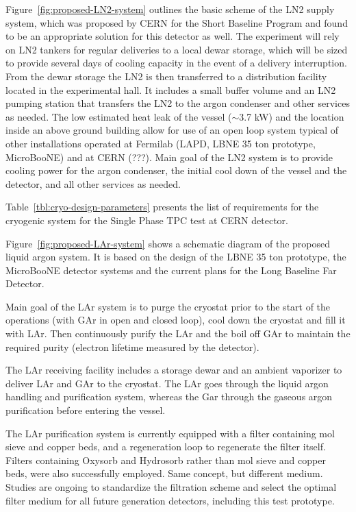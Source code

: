 Figure~\ref{fig:proposed-LN2-system} outlines the basic scheme of the LN2 supply system, which was 
proposed by CERN for the Short Baseline Program and found to be an appropriate solution for this 
detector as well. The experiment will rely on LN2 tankers for regular deliveries to a local dewar storage, 
which will be sized to provide several days of cooling capacity in the event of a delivery interruption. 
From the dewar storage the LN2 is then transferred to a distribution facility located in the experimental 
hall. It includes a small buffer volume and an LN2 pumping station that transfers the LN2 to the argon 
condenser and other services as needed. The low estimated heat leak of the vessel ($\sim$3.7 kW) and the 
location inside an above ground building allow for use of an open loop system typical of other 
installations operated at Fermilab (LAPD, LBNE 35 ton prototype, MicroBooNE) and at CERN (???). 
Main goal of the LN2 system is to provide cooling power for the argon condenser, the initial cool down of 
the vessel and the detector, and all other services as needed.

 Table~\ref{tbl:cryo-design-parameters} presents the list of 
requirements for the cryogenic system for the Single Phase TPC test at CERN detector.

Figure~\ref{fig:proposed-LAr-system} shows a schematic diagram of the proposed liquid argon system. It is based on the design of the 
LBNE 35 ton prototype, the MicroBooNE detector systems and the current plans for the Long Baseline Far 
Detector.

Main goal of the LAr system is to purge the cryostat prior to the start of the operations (with GAr in open 
and closed loop), cool down the cryostat and fill it with LAr. Then continuously purify the LAr and the boil 
off GAr to maintain the required purity (electron lifetime measured by the detector).

The LAr receiving facility includes a storage dewar and an ambient vaporizer to deliver LAr and GAr to the 
cryostat. The LAr goes through the liquid argon handling and purification system, whereas the Gar 
through the gaseous argon purification before entering the vessel.

The LAr purification system is currently equipped with a filter containing mol sieve and copper beds, and 
a regeneration loop to regenerate the filter itself. Filters containing Oxysorb and Hydrosorb rather than 
mol sieve and copper beds, were also successfully employed. Same concept, but different medium. 
Studies are ongoing to standardize the filtration scheme and select the optimal filter medium for all 
future generation detectors, including this test prototype. 

